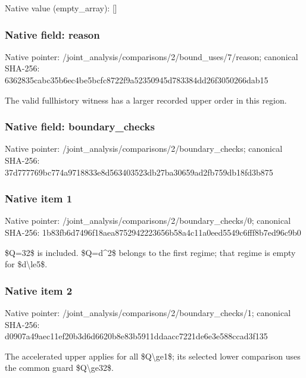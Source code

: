 \documentclass[10pt,a4paper]{article}
\begin{document}
Native value (empty\_array): []



\subsubsection{Native field: reason}


Native pointer: /joint\_analysis/comparis\allowbreak{}ons/2/bound\_uses/7/reaso\allowbreak{}n; canonical SHA-256: 6362835cabc35b6ec4be5bcf\allowbreak{}c8722f9a52350945d783384d\allowbreak{}d26f3050266dab15


The valid fullhistory witness has a larger recorded upper order in this region.


\subsubsection{Native field: boundary\_checks}


Native pointer: /joint\_analysis/comparis\allowbreak{}ons/2/boundary\_checks; canonical SHA-256: 37d777769bc774a9718833e8\allowbreak{}d563403523db27ba30659ad2\allowbreak{}fb759db18fd3b875



\subsubsection{Native item 1}


Native pointer: /joint\_analysis/comparis\allowbreak{}ons/2/boundary\_checks/0; canonical SHA-256: 1b83fb6d7496f18aea875294\allowbreak{}2223656b58a4c11a0eed5549\allowbreak{}c6fff8b7ed96c9b0


\$Q=32\$ is included. \$Q=d\textasciicircum{}2\$ belongs to the first regime; that regime is empty for \$d\textbackslash{}le5\$.


\subsubsection{Native item 2}


Native pointer: /joint\_analysis/comparis\allowbreak{}ons/2/boundary\_checks/1; canonical SHA-256: d0907a49aec11ef20b3d6d66\allowbreak{}20b8e83b5911ddaacc7221de\allowbreak{}6e3e588ccad3f135


The accelerated upper applies for all \$Q\textbackslash{}ge1\$; its selected lower comparison uses the common guard \$Q\textbackslash{}ge32\$.
\end{document}

